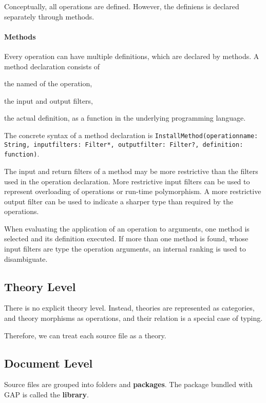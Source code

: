 Conceptually, all operations are defined.
However, the definiens is declared separately through methods.

\paragraph{Methods}
Every operation can have multiple definitions, which are declared by methods.
A method declaration consists of
\begin{compactitem}
  \item the named of the operation,
  \item the input and output filters,
  \item the actual definition, as a function in the underlying programming language.
\end{compactitem}

The concrete syntax of a method declaration is
\lstinline|InstallMethod(operationname: String, inputfilters: Filter*, outputfilter: Filter?, definition: function)|.

The input and return filters of a method may be more restrictive than the filters used in the operation declaration.
More restrictive input filters can be used to represent overloading of operations or run-time polymorphism.
A more restrictive output filter can be used to indicate a sharper type than required by the operations.

When evaluating the application of an operation to arguments, one method is selected and its definition executed.
If more than one method is found, whose input filters are type the operation arguments, an internal ranking is used to disambiguate.

\subsection{Theory Level}

There is no explicit theory level.
Instead, theories are represented as categories, and theory morphisms as operations, and their relation is a special case of typing.

Therefore, we can treat each source file as a theory.

\subsection{Document Level}

Source files are grouped into folders and \textbf{packages}.
The package bundled with GAP is called the \textbf{library}.
